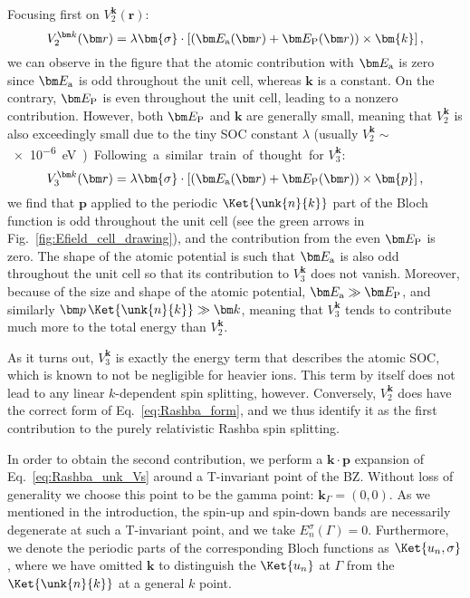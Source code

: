 Focusing first on $V^{\bm k}_2(\bm r)$:
\begin{equation}
	\label{eq:Rashba_purerel}
	V^{\bm k}_2(\bm r) = \lambda \bm{\sigma} \cdot \left[ (\bm E_{\rm a}(\bm r) + \bm E_{\rm P}(\bm r)) \times \bm{k}\right],
\end{equation}
we can observe in the figure that the atomic contribution with $\bm E_{\rm a}$ is zero since $\bm E_{\rm a}$ is odd throughout the unit cell, whereas $\bm k$ is a constant.
On the contrary, $\bm E_{\rm P}$ is even throughout the unit cell, leading to a nonzero contribution.
However, both $\bm E_{\rm P}$ and $\bm k$ are generally small, meaning that $V^{\bm k}_2$ is also exceedingly small due to the tiny \gls{SOC} constant $\lambda$ (usually $V^{\bm k}_2 \sim$ \SI{e-6}eV).
    
Following a similar train of thought for $V^{\bm k}_3$:
\begin{equation}
	V^{\bm k}_3(\bm r) = \lambda \bm{\sigma} \cdot \left[ (\bm E_{\rm a}(\bm r) + \bm E_{\rm P}(\bm r)) \times \bm{p}\right],
\end{equation}
we find that $\bm p$ applied to the periodic $\Ket{\unk{n}{k}}$ part of the Bloch function is odd throughout the unit cell (see the green arrows in Fig.~\ref{fig:Efield_cell_drawing}), and the contribution from the even $\bm E_{\rm P}$ is zero.
The shape of the atomic potential is such that $\bm E_{\rm a}$ is also odd throughout the unit cell so that its contribution to $V^{\bm k}_3$ does not vanish.
Moreover, because of the size and shape of the atomic potential, $\bm E_{\rm a} \gg \bm E_{\rm P}$, and similarly $\bm p\,\Ket{\unk{n}{k}} \gg \bm k$, meaning that $V^{\bm k}_3$ tends to contribute much more to the total energy than $V^{\bm k}_2$.

As it turns out, $V^{\bm k}_3$ is exactly the energy term that describes the atomic \gls{SOC}, which is known to not be negligible for heavier ions.
This term by itself does not lead to any linear $k$-dependent spin splitting, however.
Conversely, $V_2^{\bm k}$ does have the correct form of Eq.~\eqref{eq:Rashba_form}, and we thus identify it as the first contribution to the purely relativistic Rashba spin splitting.
    
In order to obtain the second contribution, we perform a $\bm k \cdot \bm p$ expansion of Eq.~\eqref{eq:Rashba_unk_Vs} around a \gls{T}-invariant point of the \gls{BZ}.
Without loss of generality we choose this point to be the gamma point: $\bm{k}_\Gamma = (0, 0)$.
As we mentioned in the introduction, the spin-up and spin-down bands are necessarily degenerate at such a \gls{T}-invariant point, and we take $E^{\sigma}_n(\Gamma) = 0$.
Furthermore, we denote the periodic parts of the corresponding Bloch functions as $\Ket{u_n, \sigma}$, where we have omitted $\bm k$ to distinguish the $\Ket{u_n}$ at $\Gamma$ from the $\Ket{\unk{n}{k}}$ at a general $k$ point.

